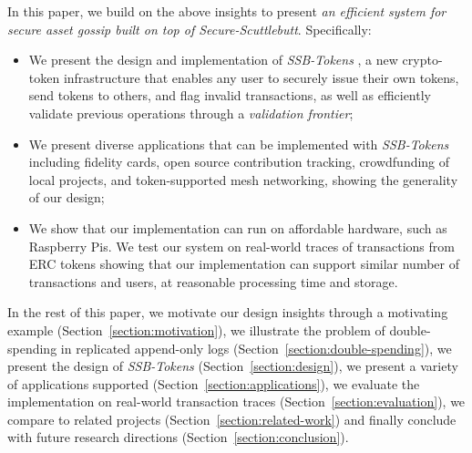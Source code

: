 \documentclass[sigplan,screen,10pt]{acmart}
\newcommand\ssbtokens[0]{\textit{SSB-Tokens} }
\begin{document}

In this paper, we build on the above insights to present \textit{an efficient system for secure asset gossip built on top of Secure-Scuttlebutt}. Specifically:
\begin{itemize}
 \item We present the design and implementation of \ssbtokens, a new crypto-token infrastructure that enables any user to securely issue their own tokens, send tokens to others, and flag invalid transactions, as well as efficiently validate previous operations through a \textit{validation frontier};
 \item  We present diverse applications that can be implemented with \ssbtokens  including fidelity cards, open source contribution tracking, crowdfunding of local projects, and token-supported mesh networking, showing the generality of our design;
 \item We show that our implementation can run on affordable hardware, such as Raspberry Pis. We test our system on real-world traces of transactions from ERC tokens showing that our implementation can support similar number of transactions and users, at reasonable processing time and storage.
\end{itemize}

In the rest of this paper, we motivate our design insights through a motivating example (Section~\ref{section:motivation}), we illustrate the problem of double-spending in replicated append-only logs (Section~\ref{section:double-spending}), we present the design of \ssbtokens (Section~\ref{section:design}), we present a variety of applications supported (Section~\ref{section:applications}), we evaluate the implementation on real-world transaction traces (Section~\ref{section:evaluation}), we compare to related projects (Section~\ref{section:related-work}) and finally conclude with future research directions (Section~\ref{section:conclusion}).
\end{document}

